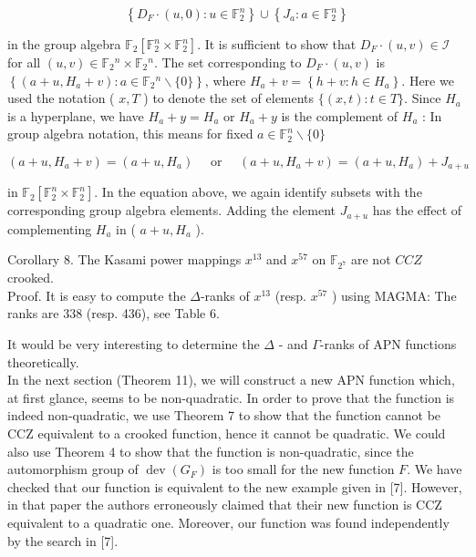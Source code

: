 \documentclass[10pt]{article}
\begin{document}
$$
\left\{D_{F} \cdot(u, 0): u \in \mathbb{F}_{2}^{n}\right\} \cup\left\{J_{a}: a \in \mathbb{F}_{2}^{n}\right\}
$$

in the group algebra $\mathbb{F}_{2}\left[\mathbb{F}_{2}^{n} \times \mathbb{F}_{2}^{n}\right]$. It is sufficient to show that $D_{F} \cdot(u, v) \in \mathcal{I}$ for all $(u, v) \in \mathbb{F}_{2}{ }^{n} \times \mathbb{F}_{2}{ }^{n}$. The set corresponding to $D_{F} \cdot(u, v)$ is $\left\{\left(a+u, H_{a}+v\right): a \in \mathbb{F}_{2}{ }^{n} \backslash\{0\}\right\}$, where $H_{a}+v=\left\{h+v: h \in H_{a}\right\}$. Here we used the notation ( $x, T$ ) to denote the set of elements $\{(x, t): t \in T\}$. Since $H_{a}$ is a hyperplane, we have $H_{a}+y=H_{a}$ or $H_{a}+y$ is the complement of $H_{a}$ : In group algebra notation, this means for fixed $a \in \mathbb{F}_{2}^{n} \backslash\{0\}$

$$
\left(a+u, H_{a}+v\right)=\left(a+u, H_{a}\right) \quad \text { or } \quad\left(a+u, H_{a}+v\right)=\left(a+u, H_{a}\right)+J_{a+u}
$$

in $\mathbb{F}_{2}\left[\mathbb{F}_{2}^{n} \times \mathbb{F}_{2}^{n}\right]$. In the equation above, we again identify subsets with the corresponding group algebra elements. Adding the element $J_{a+u}$ has the effect of complementing $H_{a}$ in ( $a+u, H_{a}$ ).

Corollary 8. The Kasami power mappings $x^{13}$ and $x^{57}$ on $\mathbb{F}_{2^{7}}$ are not $C C Z$ crooked.\\
Proof. It is easy to compute the $\Delta$-ranks of $x^{13}$ (resp. $x^{57}$ ) using MAGMA: The ranks are 338 (resp. 436), see Table 6.

It would be very interesting to determine the $\Delta$ - and $\Gamma$-ranks of APN functions theoretically.\\
In the next section (Theorem 11), we will construct a new APN function which, at first glance, seems to be non-quadratic. In order to prove that the function is indeed non-quadratic, we use Theorem 7 to show that the function cannot be CCZ equivalent to a crooked function, hence it cannot be quadratic. We could also use Theorem 4 to show that the function is non-quadratic, since the automorphism group of $\operatorname{dev}\left(G_{F}\right)$ is too small for the new function $F$. We have checked that our function is equivalent to the new example given in [7]. However, in that paper the authors erroneously claimed that their new function is CCZ equivalent to a quadratic one. Moreover, our function was found independently by the search in [7].
\end{document}
